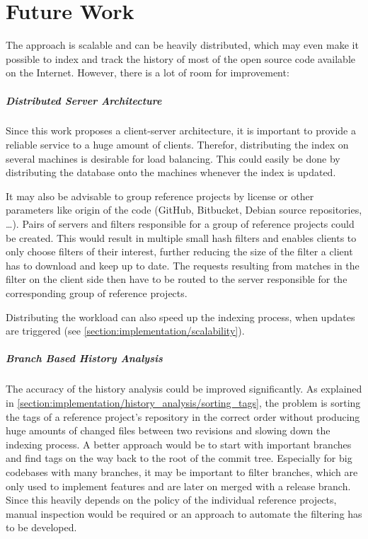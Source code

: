 
\chapter{Future Work}\label{chapter:future_work}
The approach is scalable and can be heavily distributed, which may even make it possible to index and track the history of most of the open source code available on the Internet.
However, there is a lot of room for improvement:

\paragraph{Distributed Server Architecture}
Since this work proposes a client-server architecture, it is important to provide a reliable service to a huge amount of clients.
Therefor, distributing the index on several machines is desirable for load balancing.
This could easily be done by distributing the database onto the machines whenever the index is updated.

It may also be advisable to group reference projects by license or other parameters like origin of the code (GitHub, Bitbucket, Debian source repositories, \dots).
Pairs of servers and filters responsible for a group of reference projects could be created.
This would result in multiple small hash filters and enables clients to only choose filters of their interest, further reducing the size of the filter a client has to download and keep up to date.
The requests resulting from matches in the filter on the client side then have to be routed to the server responsible for the corresponding group of reference projects.

Distributing the workload can also speed up the indexing process, when updates are triggered (see \autoref{section:implementation/scalability}).

\paragraph{Branch Based History Analysis}
The accuracy of the history analysis could be improved significantly.
As explained in \autoref{section:implementation/history_analysis/sorting_tags}, the problem is sorting the tags of a reference project's repository in the correct order without producing huge amounts of changed files between two revisions and slowing down the indexing process.
A better approach would be to start with important branches and find tags on the way back to the root of the commit tree.
Especially for big codebases with many branches, it may be important to filter branches, which are only used to implement features and are later on merged with a release branch.
Since this heavily depends on the policy of the individual reference projects, manual inspection would be required or an approach to automate the filtering has to be developed.

